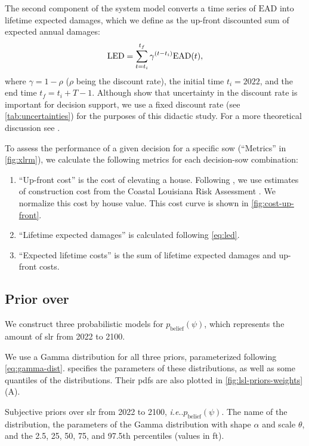 \documentclass[11pt]{article}
\makeatletter
\DeclareRobustCommand\onedot{\futurelet\@let@token\@onedot}
\def\@onedot{\ifx\@let@token.\else.\null\fi\xspace}
\def\ie{\emph{i.e}\onedot} \def\Ie{\emph{I.e}\onedot}
\DeclareRobustCommand\onedot{\futurelet\@let@token\@onedot}
\def\@onedot{\ifx\@let@token.\else.\null\fi\xspace}
\def\ie{\emph{i.e}\onedot} \def\Ie{\emph{I.e}\onedot}
\makeatother
\begin{document}
The second component of the system model converts a time series of $\mathrm{EAD}$ into lifetime expected damages, which we define as the up-front  discounted sum of expected annual damages:
\begin{equation}\label{eq:led}
    \textrm{LED} = \sum_{t=t_i}^{t_f} \gamma^{\qty(t-t_i)} \textrm{EAD}(t),
\end{equation}
where  $\gamma = 1- \rho$ ($\rho$ being the discount rate), the initial time $t_i=2022$, and the end time $t_f = t_i + T - 1$.
Although \citet{zarekarizi_suboptimal:2020} show that uncertainty in the discount rate is important for decision support, we use a fixed discount rate (see \cref{tab:uncertainties}) for the purposes of this didactic study.
For a more theoretical discussion see \citet{arrow_discount:2013}.

To assess the performance of a given decision for a specific \gls{sow} (``Metrics'' in \cref{fig:xlrm}), we calculate the following metrics for each decision-\gls{sow} combination:
\begin{enumerate}
    \item ``Up-front cost'' is the cost of elevating a house. Following \citet{zarekarizi_suboptimal:2020}, we use estimates of construction cost from the Coastal Louisiana Risk Assessment \citep{fischbach_clara:2012}. We normalize this cost by house value. This cost curve is shown in \cref{fig:cost-up-front}.
    \item ``Lifetime expected damages'' is calculated following \cref{eq:led}.
    \item ``Expected lifetime costs'' is the sum of lifetime expected damages and up-front costs.
\end{enumerate}

\subsection{Prior over }\label{sec:case-priors}

We construct three probabilistic models for $p_\mathrm{belief}(\psi)$, which represents the amount of \gls{slr} from 2022 to 2100.

We use a Gamma distribution for all three priors, parameterized following \cref{eq:gamma-dist}.
 specifies the parameters of these distributions, as well as some quantiles of the distributions.
Their \glspl{pdf} are also plotted in \cref{fig:lsl-priors-weights}(A).

\begin{table}[h]
    \centering
    \caption{
        Subjective priors over \gls{slr} from 2022 to 2100, \ie $p_\mathrm{belief}(\psi)$.
        The name of the distribution, the parameters of the Gamma distribution with shape $\alpha$ and scale $\theta$, and the 2.5, 25, 50, 75, and 97.5th percentiles (values in \si{ft}).
    }\label{tab:slr-priors}
    
\end{table}
\end{document}
